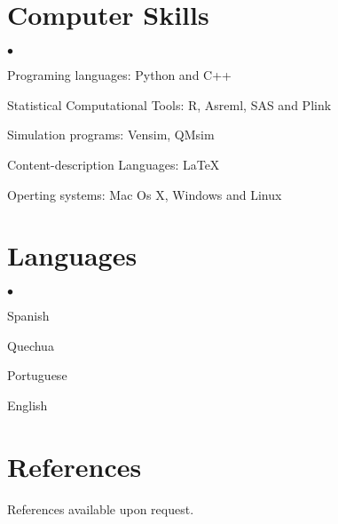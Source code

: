\documentclass[margin,line,10pt]{res}
\newenvironment{list2}{
  \begin{list}{$\bullet$}{%
      \setlength{\itemsep}{0in}
      \setlength{\parsep}{0in} \setlength{\parskip}{0in}
      \setlength{\topsep}{0in} \setlength{\partopsep}{0in} 
      \setlength{\leftmargin}{0.2in}}}{\end{list}}
\begin{document}
\begin{resume}
\section{\sc Computer Skills} 
\begin{list2}
\item Programing languages: Python and C++
\vspace{0.3cm}
\item Statistical Computational Tools: R, Asreml, SAS and Plink
\vspace{0.3cm}
\item Simulation programs: Vensim, QMsim
\vspace{0.3cm}
\item Content-description Languages: \LaTeX
\vspace{0.3cm}
\item Operting systems: Mac Os X, Windows and Linux  
\end{list2}

\section{\sc Languages} 
\begin{list2}
\vspace{0.3cm}
\item Spanish
\vspace{0.3cm}
\item Quechua
\vspace{0.3cm}
\item Portuguese
\vspace{0.3cm}
\item English
\end{list2}

\section{\sc References}
References available upon request. 

\end{resume}
\end{document}
